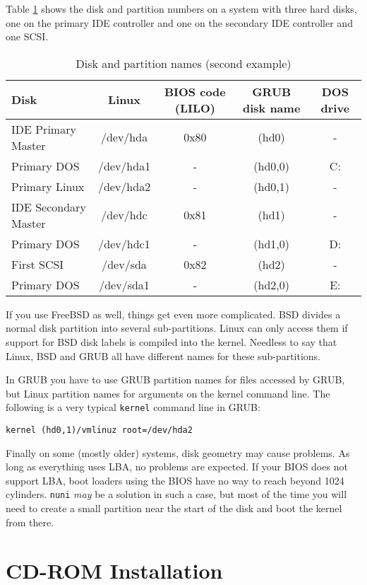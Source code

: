 \documentclass[12pt,a4paper]{article}
\begin{document}
Table \ref{partexampl2} shows the disk and partition numbers on a
system with three hard disks, one on the primary IDE controller and one
on the secondary IDE controller and one SCSI.

\begin{table}
{\small
\begin{tabular}{|l|c|c|c|c|}
\hline
Disk & Linux & BIOS code (LILO) & GRUB disk name&DOS drive\\
\hline
IDE Primary Master & /dev/hda & 0x80 & (hd0)    & -\\
Primary DOS        & /dev/hda1& -    & (hd0,0)  & C:\\
Primary Linux      & /dev/hda2& -    & (hd0,1)  & -\\
\hline
IDE Secondary Master& /dev/hdc & 0x81 & (hd1)    & -\\
Primary DOS        & /dev/hdc1& -    & (hd1,0)  & D:\\
\hline
First SCSI         & /dev/sda & 0x82 & (hd2)   & -\\
Primary DOS        & /dev/sda1& -    & (hd2,0) & E:\\
\hline
\end{tabular}}
\caption{\label{partexampl2}Disk and partition names (second example)} 
\end{table}

If you use FreeBSD as well, things get even more complicated. BSD
divides a normal disk partition into several sub-partitions. Linux can
only access them if support for BSD disk labels is compiled into the
kernel. Needless to say that Linux, BSD and GRUB all have different
names for these sub-partitions. 

In GRUB you have to use GRUB partition names for files accessed by GRUB,
but Linux partition names for arguments on the kernel command
line. The following is a very typical {\tt kernel} command line in GRUB:
\begin{verbatim}
kernel (hd0,1)/vmlinuz root=/dev/hda2
\end{verbatim}

Finally on some (mostly older) systems, disk geometry may cause
problems. As long as everything uses LBA, no problems are expected. If
your BIOS does not support LBA, boot loaders using the BIOS have no
way to reach beyond 1024 cylinders. {\tt nuni} {\em may} be a solution
in such a case, but most of the time you will need to create a small
partition near the start of the disk and boot the kernel from there.

\section{CD-ROM Installation}
\end{document}
